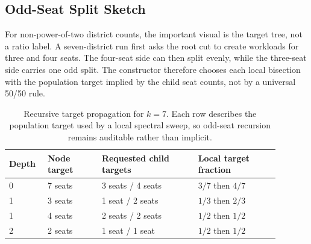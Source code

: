 \subsection{Odd-Seat Split Sketch}

For non-power-of-two district counts, the important visual is the target tree,
not a ratio label. A seven-district run first asks the root cut to create
workloads for three and four seats. The four-seat side can then split evenly,
while the three-seat side carries one odd split. The constructor therefore
chooses each local bisection with the population target implied by the child
seat counts, not by a universal 50/50 rule.

\begin{table}[h]
\centering
\small
\begin{tabular}{p{0.12\linewidth}p{0.18\linewidth}p{0.32\linewidth}p{0.27\linewidth}}
\toprule
Depth & Node target & Requested child targets & Local target fraction \\
\midrule
0 & 7 seats & 3 seats / 4 seats & \(3/7\) then \(4/7\) \\
1 & 3 seats & 1 seat / 2 seats & \(1/3\) then \(2/3\) \\
1 & 4 seats & 2 seats / 2 seats & \(1/2\) then \(1/2\) \\
2 & 2 seats & 1 seat / 1 seat & \(1/2\) then \(1/2\) \\
\bottomrule
\end{tabular}
\caption{Recursive target propagation for \(k=7\). Each row describes the
population target used by a local spectral sweep, so odd-seat recursion remains
auditable rather than implicit.}
\end{table}
